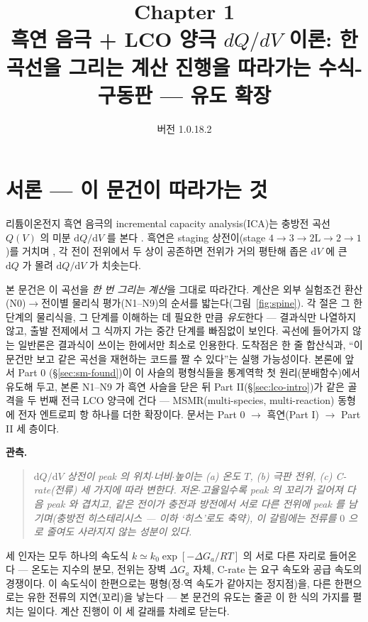 \documentclass[11pt,a4paper]{article}
\title{\textbf{\LARGE Chapter 1}\\[0.35em]\Large 흑연 음극 + LCO 양극 $dQ/dV$ 이론: 한 곡선을 그리는 계산 진행을 따라가는 수식-구동판 — 유도 확장}
\author{}
\date{\normalsize 버전 1.0.18.2}
\newcommand{\dd}{\mathrm{d}}
\begin{document}
\maketitle

\section*{서론 — 이 문건이 따라가는 것}
리튬이온전지 흑연 음극의 incremental capacity analysis(ICA)는 충방전 곡선 $Q(V)$ 의 미분
$\dd Q/\dd V$ 를 본다 \cite{bloom2005,dubarry2012}. 흑연은 staging 상전이(stage
$4\!\to\!3\!\to\!2\mathrm L\!\to\!2\!\to\!1$)를 거치며 \cite{dahn1991,ohzuku1993}, 각 전이 전위에서
두 상이 공존하면 전위가 거의 평탄해 좁은 $\dd V$ 에 큰 $\dd Q$ 가 몰려 $\dd Q/\dd V$ 가 치솟는다.

본 문건은 이 곡선을 \emph{한 번 그리는 계산}을 그대로 따라간다. 계산은 외부 실험조건 환산(N0)$\to$전이별
물리식 평가(N1--N9)의 순서를 밟는다(그림~\ref{fig:spine}). 각 절은 그 한 단계의 물리식을, 그 단계를 이해하는 데 필요한 만큼
\emph{유도}한다 — 결과식만 나열하지 않고, 출발 전제에서 그 식까지 가는 중간 단계를 빠짐없이 보인다. 곡선에 들어가지 않는 일반론은 결과식이 쓰이는 한에서만 최소로 인용한다. 도착점은 한 줄
합산식과, ``이 문건만 보고 같은 곡선을 재현하는 코드를 짤 수 있다''는 실행 가능성이다. 본론에 앞서 Part 0
(\S\ref{sec:sm-found})이 이 사슬의 평형식들을 통계역학 첫 원리(분배함수)에서 유도해 두고, 본론 N1--N9 가 흑연
사슬을 닫은 뒤 Part II(\S\ref{sec:lco-intro})가 같은 골격을 두 번째 전극 LCO 양극에 건다 — MSMR(multi-species,
multi-reaction) 동형에 전자 엔트로피 항 하나를 더한 확장이다. 문서는 Part 0 $\to$ 흑연(Part I) $\to$ Part II 세 층이다.

\textbf{관측.}
\begin{quote}\itshape
$\dd Q/\dd V$ 상전이 peak 의 위치$\cdot$너비$\cdot$높이는 (a) 온도 $T$, (b) 극판 전위, (c) C-rate(전류)
세 가지에 따라 변한다. 저온$\cdot$고율일수록 peak 의 꼬리가 길어져 다음 peak 와 겹치고, 같은 전이가 충전과 방전에서
서로 다른 전위에 peak 를 남기며(충방전 히스테리시스 — 이하 `히스'로도 축약), 이 갈림에는 전류를 $0$ 으로 줄여도 사라지지 않는 성분이 있다.
\end{quote}

세 인자는 모두 하나의 속도식 $k\simeq k_0\exp[-\Delta G_a/RT]$ 의 서로 다른 자리로 들어온다 — 온도는 지수의 분모,
전위는 장벽 $\Delta G_a$ 자체, C-rate 는 요구 속도와 공급 속도의 경쟁이다. 이 속도식이 한편으로는 평형(정$\cdot$역
속도가 같아지는 정지점)을, 다른 한편으로는 유한 전류의 지연(꼬리)을 낳는다 — 본 문건의 유도는 줄곧 이 한 식의 가지를
펼치는 일이다. 계산 진행이 이 세 갈래를 차례로 닫는다.
\end{document}
